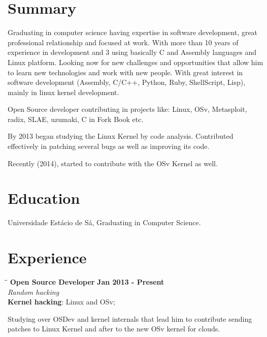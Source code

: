 \documentclass[margin]{res}
\begin{document}

\address{Juazeiro do Norte, Brazil \\ \href{mailto:geyslan@gmail.com}{geyslan@gmail.com} \\ Phone: 55 88 9617 0441 \\ Postal Code: 63034-100 }


\begin{resume}

\section{Summary}  Graduating in computer science having expertise in software development, great professional relationship
                        and focused at work. With more than 10 years of experience in development and 3 using basically C and
                        Assembly languages and Linux platform. Looking now for new challenges and opportunities that allow him to learn
                        new technologies and work with new people. With great interest in software development (Assembly, C/C++, Python,
                        Ruby, ShellScript, Lisp), mainly in linux kernel development.

                        Open Source developer contributing in projects like: Linux, OSv, Metasploit, radix, SLAE, uzumaki,
                        C in Fork Book etc.

                        By 2013 began studying the Linux Kernel by code analysis. Contributed effectively in patching several bugs
                        as well as improving its code.

                        Recently (2014), started to contribute with the OSv Kernel as well.

\section{Education}	Universidade Estácio de Sá, Graduating in Computer Science.

\section{Experience}

\vspace{-0.1in}
   \begin{tabbing}
   \hspace{2.3in}\= \hspace{1.7in}\= \kill %
    \textbf{Open Source Developer}    \>\>\textbf{Jan 2013 - Present}\\
    \textit{Random hacking}\\
    \textbf{Kernel hacking}: Linux and OSv;
   \end{tabbing}\vspace{-20pt}      %
    \vspace{2mm}
    Studying over OSDev and kernel internals that lead him to contribute sending patches to Linux Kernel and after to the new OSv kernel
    for clouds.


\end{resume}
\end{document}
